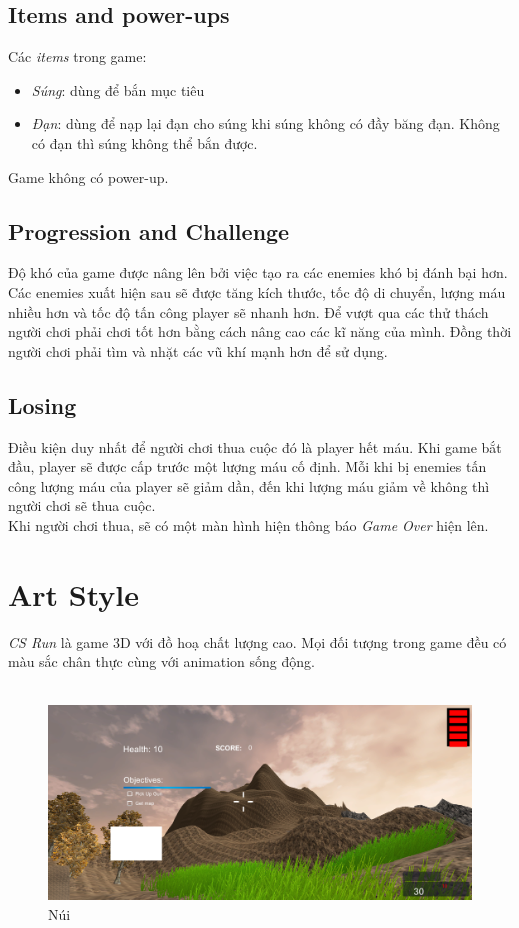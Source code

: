 \documentclass[14pt,a4paper]{extreport}
\begin{document}
\section{Items and power-ups}
Các \textit{items} trong game: 
\begin{itemize}
	\item \textit{Súng}: dùng để bắn mục tiêu
	\item \textit{Đạn}: dùng để nạp lại đạn cho súng khi súng không có đầy băng đạn. Không có đạn thì súng không thể bắn được.

\end{itemize}

Game không có power-up.

\section{Progression and Challenge}
Độ khó của game được nâng lên bởi việc tạo ra các enemies khó bị đánh bại hơn. Các enemies xuất hiện sau sẽ được tăng kích thước, tốc độ di chuyển, lượng máu nhiều hơn và tốc độ tấn công player sẽ nhanh hơn. Để vượt qua các thử thách người chơi phải chơi tốt hơn bằng cách nâng cao các kĩ năng của mình. Đồng thời người chơi phải tìm và nhặt các vũ khí mạnh hơn để sử dụng.


\section{Losing}
Điều kiện duy nhất để người chơi thua cuộc đó là player hết máu. Khi game bắt đầu, player sẽ được cấp trước một lượng máu cố định. Mỗi khi bị enemies tấn công lượng máu của player sẽ giảm dần, đến khi lượng máu giảm về không thì người chơi sẽ thua cuộc. \\
Khi người chơi thua, sẽ có một màn hình hiện thông báo \textit{Game Over} hiện lên.

\chapter{Art Style}
\textit{CS Run} là game 3D với đồ hoạ chất lượng cao. Mọi đối tượng trong game đều có màu sắc chân thực cùng với animation sống động.\\
\\


	
\begin{figure}[h!]
	\includegraphics[scale=.5]{mountain.PNG}
	\caption{Núi}
\end{figure}
\end{document}
